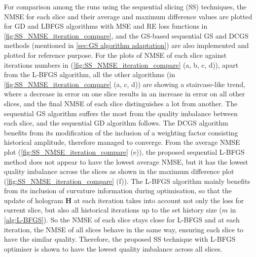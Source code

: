 For comparison among the runs using the sequential slicing (SS) techniques, the NMSE for each slice and their average and maximum difference values are plotted for GD and LBFGS algorithms with MSE and RE loss functions in \cref{fig:SS_NMSE_iteration_compare}, and the GS-based sequential GS and DCGS \cite{Zhou2019} methods (mentioned in \cref{sec:GS algorithm adaptation}) are also implemented and plotted for reference purpose. For the plots of NMSE of each slice against iterations numbers in (\cref{fig:SS_NMSE_iteration_compare} (a, b, c, d)), apart from the L-BFGS algorithm, all the other algorithms (in \cref{fig:SS_NMSE_iteration_compare} (a, c, d)) are showing a staircase-like trend, where a decrease in error on one slice results in an increase in error on all other slices, and the final NMSE of each slice distinguishes a lot from another. The sequential GS algorithm suffers the most from the quality imbalance between each slice, and the sequential GD algorithm follows. The DCGS algorithm benefits from its modification of the inclusion of a weighting factor consisting historical amplitude, therefore managed to converge. From the average NMSE plot (\cref{fig:SS_NMSE_iteration_compare} (e)), the proposed sequential L-BFGS method does not appear to have the lowest average NMSE, but it has the lowest quality imbalance across the slices as shown in the maximum difference plot (\cref{fig:SS_NMSE_iteration_compare} (f)). The L-BFGS algorithm mainly benefits from its inclusion of curvature information during optimisation, so that the update of hologram $\textbf{H}$ at each iteration takes into account not only the loss for current slice, but also all historical iterations up to the set history size ($m$ in \cref{alg:L-BFGS}). So the NMSE of each slice stays close for L-BFGS and at each iteration, the NMSE of all slices behave in the same way, ensuring each slice to have the similar quality. Therefore, the proposed SS technique with L-BFGS optimiser is shown to have the lowest quality imbalance across all slices.


